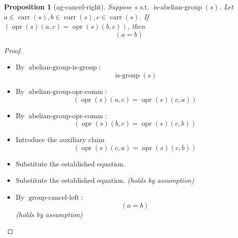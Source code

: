 \documentclass[11pt]{article}
\theoremstyle{plain}
\newtheorem{proposition}{Proposition}
\begin{document}
\begin{proposition}[ag-cancel-right]
Suppose $s \text{ s.t. } \operatorname{is\text{-}abelian\text{-}group}(s)$. Let $a \in \operatorname{carr}(s), b \in \operatorname{carr}(s), c \in \operatorname{carr}(s)$. If $(\operatorname{opr}(s)(a, c) = \operatorname{opr}(s)(b, c))$, then 
\begin{equation*}
(a = b)
\end{equation*}

\end{proposition}

\begin{proof}
\begin{itemize}[leftmargin=2.8em, itemsep=4pt, parsep=1pt]
  \item[\textbf{5}] By $\operatorname{abelian\text{-}group\text{-}is\text{-}group}$:
\begin{equation*}
\operatorname{is\text{-}group}(s)
\end{equation*}

  \item[\textbf{6}] By $\operatorname{abelian\text{-}group\text{-}opr\text{-}comm}$:
\begin{equation*}
(\operatorname{opr}(s)(a, c) = \operatorname{opr}(s)(c, a))
\end{equation*}

  \item[\textbf{7}] By $\operatorname{abelian\text{-}group\text{-}opr\text{-}comm}$:
\begin{equation*}
(\operatorname{opr}(s)(b, c) = \operatorname{opr}(s)(c, b))
\end{equation*}

  \item[\textbf{8}] Introduce the auxiliary claim
\begin{equation*}
(\operatorname{opr}(s)(c, a) = \operatorname{opr}(s)(c, b))
\end{equation*}

  \item[\textbf{9}] Substitute the established equation.
  \item[\textbf{10--11}] Substitute the established equation.  \emph{(holds by assumption)}
  \item[\textbf{12--13}] By $\operatorname{group\text{-}cancel\text{-}left}$:
\begin{equation*}
(a = b)
\end{equation*}
  \emph{(holds by assumption)}
\end{itemize}
\end{proof}
\end{document}
